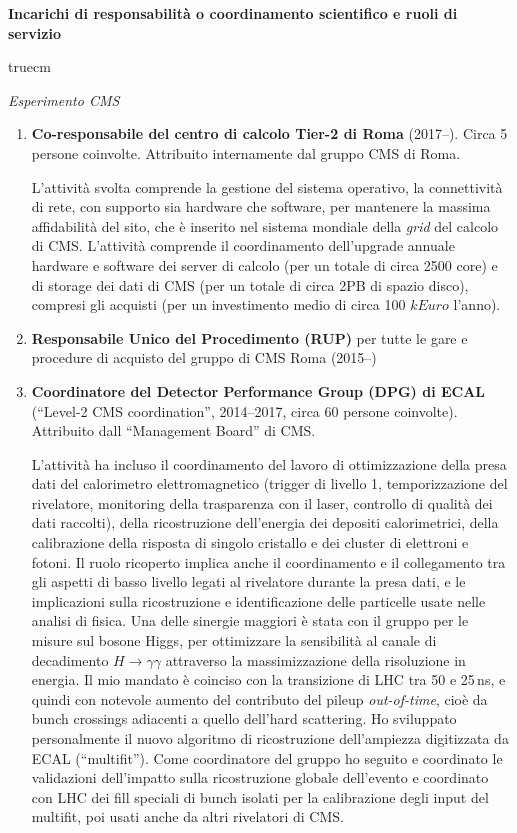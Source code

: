 \documentclass[11pt,twoside,a4paper]{article}
\begin{document}
\begin{center}
\textbf{Incarichi di responsabilit\`a o coordinamento scientifico e ruoli di servizio}
\end{center}
 truecm

\textit{Esperimento CMS}
\begin{enumerate}
\item \textbf{Co-responsabile del centro di calcolo Tier-2 di Roma}
  (2017--). Circa 5 persone coinvolte. Attribuito internamente dal
  gruppo CMS di Roma.

  L'attivit\`a svolta comprende la gestione del
  sistema operativo, la connettivit\`a di rete, con supporto sia
  hardware che software, per mantenere la massima affidabilit\`a del
  sito, che \`e inserito nel sistema mondiale della \textit{grid} del
  calcolo di CMS.  L'attivit\`a comprende il coordinamento
  dell'upgrade annuale hardware e software dei server di calcolo (per
  un totale di circa 2500 core) e di storage dei dati di CMS (per un
  totale di circa 2PB di spazio disco), compresi gli acquisti (per un
  investimento medio di circa 100 $kEuro$ l'anno).

\item \textbf{Responsabile Unico del Procedimento (RUP)} per tutte le gare e
  procedure di acquisto del gruppo di CMS Roma (2015--)

\item \textbf{Coordinatore del Detector Performance Group (DPG) di ECAL}
  (``Level-2 CMS coordination'', 2014--2017, circa 60 persone
  coinvolte). Attribuito dall ``Management Board'' di CMS.

  L'attivit\`a ha incluso il coordinamento del lavoro di
  ottimizzazione della presa dati del calorimetro elettromagnetico
  (trigger di livello 1, temporizzazione del rivelatore, monitoring
  della trasparenza con il laser, controllo di qualit\`a dei dati
  raccolti), della ricostruzione dell'energia dei depositi
  calorimetrici, della calibrazione della risposta di singolo
  cristallo e dei cluster di elettroni e fotoni. Il ruolo ricoperto
  implica anche il coordinamento e il collegamento tra gli aspetti di
  basso livello legati al rivelatore durante la presa dati, e le
  implicazioni sulla ricostruzione e identificazione delle particelle
  usate nelle analisi di fisica. Una delle sinergie maggiori \`e stata
  con il gruppo per le misure sul bosone Higgs, per ottimizzare la
  sensibilit\`a al canale di decadimento $H\to\gamma\gamma$ attraverso
  la massimizzazione della risoluzione in energia. Il mio mandato \`e
  coinciso con la transizione di LHC tra 50 e 25\,ns, e quindi con
  notevole aumento del contributo del pileup \textit{out-of-time},
  cio\`e da bunch crossings adiacenti a quello dell'hard scattering.
  Ho sviluppato personalmente il nuovo algoritmo di ricostruzione
  dell'ampiezza digitizzata da ECAL (``multifit''). Come coordinatore
  del gruppo ho seguito e coordinato le validazioni dell'impatto sulla
  ricostruzione globale dell'evento e coordinato con LHC dei fill speciali
  di bunch isolati per la calibrazione degli input del multifit, poi
  usati anche da altri rivelatori di CMS.


\end{enumerate}
\end{document}
